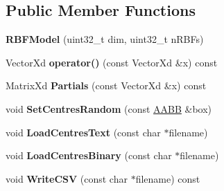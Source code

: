 \subsection*{Public Member Functions}
\begin{DoxyCompactItemize}
\item 
\hypertarget{struct_d_r_d_s_p_1_1_r_b_f_model_a3f1cbdc52c3439d9936f1703950eb275}{{\bfseries R\-B\-F\-Model} (uint32\-\_\-t dim, uint32\-\_\-t n\-R\-B\-Fs)}\label{struct_d_r_d_s_p_1_1_r_b_f_model_a3f1cbdc52c3439d9936f1703950eb275}

\item 
\hypertarget{struct_d_r_d_s_p_1_1_r_b_f_model_a097398c265c5a82ee0d948dcc26575b6}{Vector\-Xd {\bfseries operator()} (const Vector\-Xd \&x) const }\label{struct_d_r_d_s_p_1_1_r_b_f_model_a097398c265c5a82ee0d948dcc26575b6}

\item 
\hypertarget{struct_d_r_d_s_p_1_1_r_b_f_model_a72e4968e1457515616efcb1428685c49}{Matrix\-Xd {\bfseries Partials} (const Vector\-Xd \&x) const }\label{struct_d_r_d_s_p_1_1_r_b_f_model_a72e4968e1457515616efcb1428685c49}

\item 
\hypertarget{struct_d_r_d_s_p_1_1_r_b_f_model_abc42d62684a26198ac8de58c6436a7df}{void {\bfseries Set\-Centres\-Random} (const \hyperlink{struct_d_r_d_s_p_1_1_a_a_b_b}{A\-A\-B\-B} \&box)}\label{struct_d_r_d_s_p_1_1_r_b_f_model_abc42d62684a26198ac8de58c6436a7df}

\item 
\hypertarget{struct_d_r_d_s_p_1_1_r_b_f_model_afe0b01366727ad77ef1d3ea42ccfcdb1}{void {\bfseries Load\-Centres\-Text} (const char $\ast$filename)}\label{struct_d_r_d_s_p_1_1_r_b_f_model_afe0b01366727ad77ef1d3ea42ccfcdb1}

\item 
\hypertarget{struct_d_r_d_s_p_1_1_r_b_f_model_a7fafa6d253c14a0dd633c39b5a297c51}{void {\bfseries Load\-Centres\-Binary} (const char $\ast$filename)}\label{struct_d_r_d_s_p_1_1_r_b_f_model_a7fafa6d253c14a0dd633c39b5a297c51}

\item 
\hypertarget{struct_d_r_d_s_p_1_1_r_b_f_model_a3c20e3ed4678798de71698f8c4b415f3}{void {\bfseries Write\-C\-S\-V} (const char $\ast$filename) const }\label{struct_d_r_d_s_p_1_1_r_b_f_model_a3c20e3ed4678798de71698f8c4b415f3}

\end{DoxyCompactItemize}
